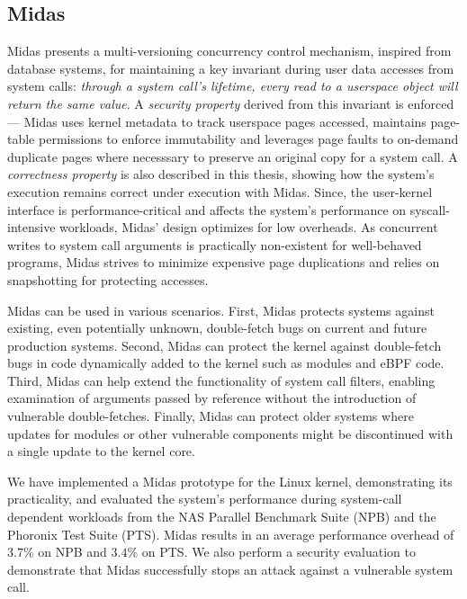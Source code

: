 \subsection{Midas}
Midas presents a multi-versioning concurrency control mechanism, inspired
from database systems, for maintaining a key invariant during user data
accesses from system calls:
\emph{through a system call's lifetime, every read to a userspace object
will return the same value}.
A \emph{security property} derived from this invariant is enforced ---
Midas uses kernel metadata to track userspace pages accessed, maintains
page-table permissions to enforce immutability and leverages page faults
to on-demand duplicate pages where necesssary to preserve an original
copy for a system call.
A \emph{correctness property} is also described in this thesis,
showing how the system's execution remains correct under execution with
Midas.
Since, the user-kernel interface is performance-critical and 
affects the system's performance on syscall-intensive workloads,
Midas' design optimizes for low overheads.
As concurrent writes to system call arguments is practically non-existent
for well-behaved programs, Midas strives to minimize expensive page 
duplications and relies on snapshotting for protecting accesses.

Midas can be used in various scenarios. 
First, Midas protects systems against existing, even potentially unknown,
double-fetch bugs on current and future production systems.
Second, Midas can protect the kernel against double-fetch bugs in code
dynamically added to the kernel such as modules and eBPF code.
Third, Midas can help extend the functionality of system call filters,
enabling examination of arguments passed by reference without the introduction
of vulnerable double-fetches.
Finally, Midas can protect older systems where updates for modules or other
vulnerable components might be discontinued with a single update to the
kernel core.

We have implemented a Midas prototype for the Linux kernel, demonstrating its
practicality, and evaluated the system's performance during system-call
dependent workloads from the NAS Parallel Benchmark Suite (NPB) and the
Phoronix Test Suite (PTS).
Midas results in an average performance overhead of $3.7\%$ on NPB and
$3.4\%$ on PTS.
We also perform a security evaluation to demonstrate that Midas successfully
stops an attack against a vulnerable system call.

